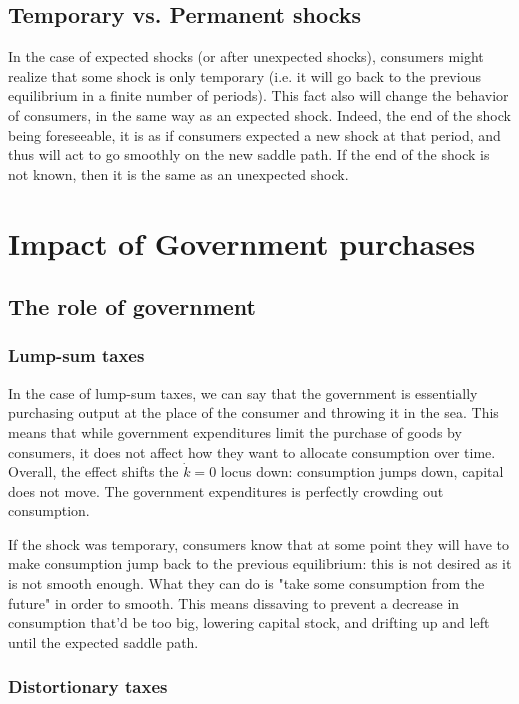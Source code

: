 \documentclass[12pt]{report}
\begin{document}
\subsection{Temporary vs. Permanent shocks}

In the case of expected shocks (or after unexpected shocks), consumers might realize that some shock is only temporary (i.e. it will go back to the previous equilibrium in a finite number of periods). This fact also will change the behavior of consumers, in the same way as an expected shock. Indeed, the end of the shock being foreseeable, it is as if consumers expected a new shock at that period, and thus will act to go smoothly on the new saddle path. If the end of the shock is not known, then it is the same as an unexpected shock.

\section{Impact of Government purchases}

\subsection{The role of government}

\subsubsection{Lump-sum taxes}

In the case of lump-sum taxes, we can say that the government is essentially purchasing output at the place of the consumer and throwing it in the sea. This means that while government expenditures limit the purchase of goods by consumers, it does not affect how they want to allocate consumption over time. Overall, the effect shifts the $\dot k =0$ locus down: consumption jumps down, capital does not move. The government expenditures is perfectly crowding out consumption.

If the shock was temporary, consumers know that at some point they will have to make consumption jump back to the previous equilibrium: this is not desired as it is not smooth enough. What they can do is "take some consumption from the future" in order to smooth. This means dissaving to prevent a decrease in consumption that'd be too big, lowering capital stock, and drifting up and left until the expected saddle path.

\subsubsection{Distortionary taxes}
\end{document}
